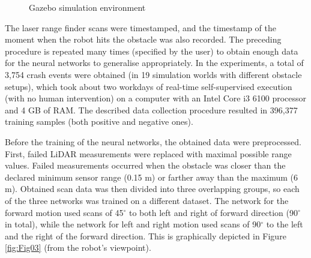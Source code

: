 \begin{figure}
    \centering
    \vfill
    \caption{Gazebo simulation environment}
    \label{fig:Fig02}
\end{figure}

The laser range finder scans were timestamped, and the timestamp of the moment when the robot hits the obstacle was also recorded. The preceding procedure is repeated many times (specified by the user) to obtain enough data for the neural networks to generalise appropriately. In the experiments, a total of 3,754 crash events were obtained (in 19 simulation worlds with different obstacle setups), which took about two workdays of real-time self-supervised execution (with no human intervention) on a computer with an Intel Core i3 6100 processor and 4 GB of RAM. The described data collection procedure resulted in 396,377 training samples (both positive and negative ones).

Before the training of the neural networks, the obtained data were preprocessed. First, failed LiDAR measurements were replaced with maximal possible range values. Failed measurements occurred when the obstacle was closer than the declared minimum sensor range (0.15 m) or farther away than the maximum (6 m). Obtained scan data was then divided into three overlapping groups, so each of the three networks was trained on a different dataset. The network for the forward motion used scans of 45$^{\circ}$ to both left and right of forward direction (90$^{\circ}$ in total), while the network for left and right motion used scans of 90$^{\circ}$ to the left and the right of the forward direction. This is graphically depicted in Figure \ref{fig:Fig03} (from the robot's viewpoint).

